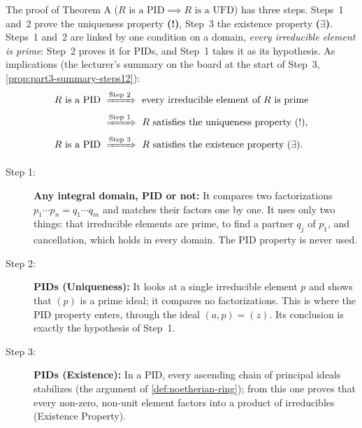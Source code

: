 \begin{content}

\begin{steps}
The proof of Theorem A ($R \text{ is a PID} \implies R \text{ is a UFD}$) has three steps. Steps~1 and~2 prove the uniqueness property \textbf{(!)}, Step~3 the existence property \textbf{($\exists$)}. Steps~1 and~2 are linked by one condition on a domain, \emph{every irreducible element is prime}: Step~2 proves it for PIDs, and Step~1 takes it as its hypothesis. As implications (the lecturer's summary on the board at the start of Step~3, \cref{prop:part3-summary-steps12}):
\begin{align*}
R \text{ is a PID} \ &\xRightarrow{\text{Step 2}} \ \text{every irreducible element of } R \text{ is prime} \\
&\xRightarrow{\text{Step 1}} \ R \text{ satisfies the uniqueness property } (!), \\
R \text{ is a PID} \ &\xRightarrow{\text{Step 3}} \ R \text{ satisfies the existence property } (\exists).
\end{align*}
\begin{description}
    \item[Step 1:] \textbf{Any integral domain, PID or not:} It compares two factorizations $p_1 \cdots p_n = q_1 \cdots q_m$ and matches their factors one by one. It uses only two things: that irreducible elements are prime, to find a partner $q_j$ of $p_1$, and cancellation, which holds in every domain. The PID property is never used.
    \item[Step 2:] \textbf{PIDs (Uniqueness):} It looks at a single irreducible element $p$ and shows that $(p)$ is a prime ideal; it compares no factorizations. This is where the PID property enters, through the ideal $(a, p) = (z)$. Its conclusion is exactly the hypothesis of Step~1.
    \item[Step 3:] \textbf{PIDs (Existence):} In a PID, every ascending chain of principal ideals stabilizes (the argument of \cref{def:noetherian-ring}); from this one proves that every non-zero, non-unit element factors into a product of irreducibles (Existence Property).

\end{description}
\end{steps}
\end{content}
